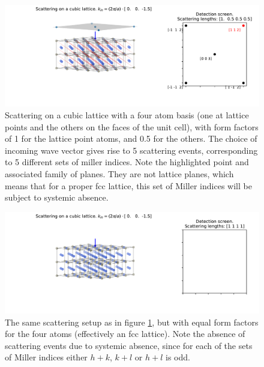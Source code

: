 \documentclass[main.tex]{subfiles}
\begin{document}
	
	\begin{figure}
		\centering
		\includegraphics[width=\linewidth]{figures/scattering_no_systemic.pdf}
		\caption{Scattering on a cubic lattice with a four atom basis (one at lattice points and the others on the faces of the unit cell), with form factors of 1 for the lattice point atoms, and 0.5 for the others. The choice of incoming wave vector gives rise to 5 scattering events, corresponding to 5 different sets of miller indices. Note the highlighted point and associated family of planes. They are not lattice planes, which means that for a proper fcc lattice, this set of Miller indices will be subject to systemic absence.}
		\label{fig:scattering_no_systemic}
	\end{figure}

	\begin{figure}
		\centering
		\includegraphics[width=\linewidth]{figures/scattering_systemic.pdf}
		\caption{The same scattering setup as in figure \ref{fig:scattering_no_systemic}, but with equal form factors for the four atoms (effectively an fcc lattice). Note the absence of scattering events due to systemic absence, since for each of the sets of Miller indices either $ h+k $, $ k+l $ or $ h+l $ is odd.}
		\label{fig:scattering_systemic}
	\end{figure}

	
\end{document}
